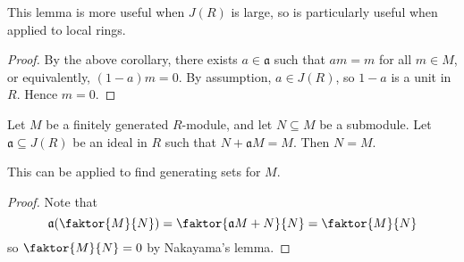 This lemma is more useful when \( J(R) \) is large, so is particularly useful when applied to local rings.
\begin{proof}
    By the above corollary, there exists \( a \in \mathfrak a \) such that \( am = m \) for all \( m \in M \), or equivalently, \( (1 - a)m = 0 \).
    By assumption, \( a \in J(R) \), so \( 1 - a \) is a unit in \( R \).
    Hence \( m = 0 \).
\end{proof}
\begin{corollary}
    Let \( M \) be a finitely generated \( R \)-module, and let \( N \subseteq M \) be a submodule.
    Let \( \mathfrak a \subseteq J(R) \) be an ideal in \( R \) such that \( N + \mathfrak a M = M \).
    Then \( N = M \).
\end{corollary}
This can be applied to find generating sets for \( M \).
\begin{proof}
    Note that
    \[ \mathfrak a \qty(\faktor{M}{N}) = \faktor{\mathfrak a M + N}{N} = \faktor{M}{N} \]
    so \( \faktor{M}{N} = 0 \) by Nakayama's lemma.
\end{proof}

